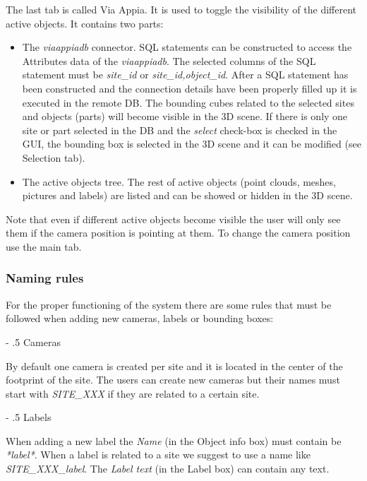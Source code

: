 \documentclass[a4paper,11pt]{article}
\makeatletter
\renewcommand\paragraph{%
   \@startsection{paragraph}{4}{0mm}%
      {-\baselineskip}%
      {.5\baselineskip}%
      {\normalfont\normalsize\bfseries}}
\makeatother
\begin{document}
The last tab is called Via Appia. It is used to toggle the visibility of the different active objects. It contains two parts: 
\begin{itemize}
	\item The \textit{viaappiadb} connector. SQL statements can be constructed to access the Attributes data of the \textit{viaappiadb}. The selected columns of the SQL statement must be \textit{site\_id} or \textit{site\_id,object\_id}. After a SQL statement has been constructed and the connection details have been properly filled up it is executed in the remote DB. The bounding cubes related to the selected sites and objects (parts) will become visible in the 3D scene. If there is only one site or part selected in the DB and the \textit{select} check-box is checked in the GUI, the bounding box is selected in the 3D scene and it can be modified (see Selection tab).
	\item The active objects tree. The rest of active objects (point clouds, meshes, pictures and labels) are listed and can be showed or hidden in the 3D scene.
\end{itemize}

Note that even if different active objects become visible the user will only see them if the camera position is pointing at them. To change the camera position use the main tab.

\subsubsection{Naming rules}
\label{sec:guiname}

For the proper functioning of the system there are some rules that must be followed when adding new cameras, labels or bounding boxes:

\paragraph{Cameras}

By default one camera is created per site and it is located in the center of the footprint of the site. The users can create new cameras but their names must start with \textit{SITE\_XXX} if they are related to a certain site.

\paragraph{Labels}
 
When adding a new label the \textit{Name} (in the Object info box) must contain be \textit{*label*}. When a label is related to a site we suggest to use a name like \textit{SITE\_XXX\_label}. The \textit{Label text} (in the Label box) can contain any text.
\end{document}
